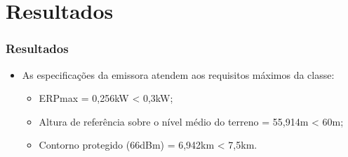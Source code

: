 \documentclass{beamer}
\begin{document}

    
    
    \section{Resultados}
    
    \begin{frame}
    
      \frametitle{Resultados}
      
      \begin{itemize}
      
      \item As especificações da emissora atendem aos requisitos máximos da classe:
     
      
	\begin{itemize}

	  \item ERPmax = 0,256kW < 0,3kW;
	  \item Altura de referência sobre o nível médio do terreno = 55,914m < 60m;
	  \item Contorno protegido (66dBm) = 6,942km < 7,5km.
      
      \end{itemize}
   \end{itemize}
    \end{frame}
    
\end{document}
